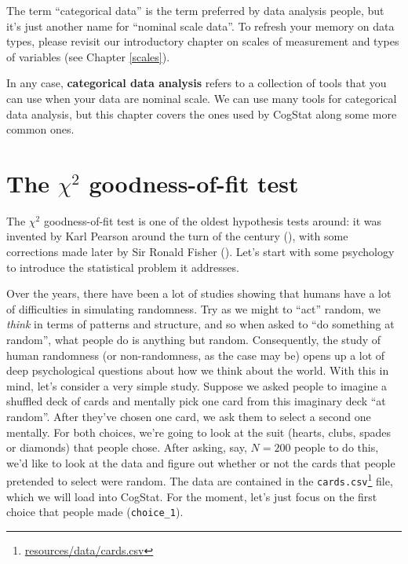 \documentclass[
  11pt,
  a4paper,
  twoside,symmetric,openright]{book}
\theoremstyle{break}
\theoremstyle{break}
\DeclareRobustCommand{\href}[2]{#2\footnote{\url{#1}}}
\begin{document}
The term ``categorical data'' is the term preferred by data analysis people, but it's just another name for ``nominal scale data''. To refresh your memory on data types, please revisit our introductory chapter on scales of measurement and types of variables (see Chapter \ref{scales}).

In any case, \textbf{categorical data analysis} refers to a collection of tools that you can use when your data are nominal scale. We can use many tools for categorical data analysis, but this chapter covers the ones used by CogStat along some more common ones.

\section{\texorpdfstring{The \(\chi^2\) goodness-of-fit test}{The \textbackslash chi\^{}2 goodness-of-fit test}}\label{goftest}

The \(\chi^2\) goodness-of-fit test is one of the oldest hypothesis tests around: it was invented by Karl Pearson around the turn of the century (), with some corrections made later by Sir Ronald Fisher (). Let's start with some psychology to introduce the statistical problem it addresses.

Over the years, there have been a lot of studies showing that humans have a lot of difficulties in simulating randomness. Try as we might to ``act'' random, we \emph{think} in terms of patterns and structure, and so when asked to ``do something at random'', what people do is anything but random. Consequently, the study of human randomness (or non-randomness, as the case may be) opens up a lot of deep psychological questions about how we think about the world. With this in mind, let's consider a very simple study. Suppose we asked people to imagine a shuffled deck of cards and mentally pick one card from this imaginary deck ``at random''. After they've chosen one card, we ask them to select a second one mentally. For both choices, we're going to look at the suit (hearts, clubs, spades or diamonds) that people chose. After asking, say, \(N=200\) people to do this, we'd like to look at the data and figure out whether or not the cards that people pretended to select were random. The data are contained in the \href{resources/data/cards.csv}{\texttt{cards.csv}} file, which we will load into CogStat. For the moment, let's just focus on the first choice that people made (\texttt{choice\_1}).
\end{document}
